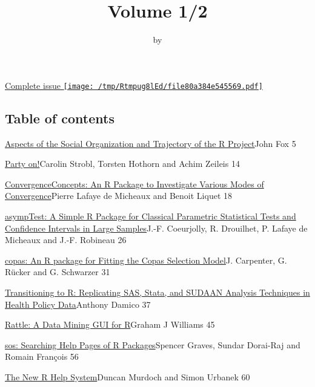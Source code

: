 \title{Volume 1/2}
\author{by }

\maketitle


\href{RJ-2009-2.pdf}{Complete issue
\protect\texttt{[image: /tmp/Rtmpug8lEd/file80a384e545569.pdf]}}

\hypertarget{table-of-contents}{%
\subsection{Table of contents}\label{table-of-contents}}

\href{../../articles/RJ-2009-014}{Aspects of the Social Organization and
Trajectory of the R Project}John Fox 5

\href{../../articles/RJ-2009-013}{Party on!}Carolin Strobl, Torsten
Hothorn and Achim Zeileis 14

\href{../../articles/RJ-2009-011}{ConvergenceConcepts: An R Package to
Investigate Various Modes of Convergence}Pierre Lafaye de Micheaux and
Benoit Liquet 18

\href{../../articles/RJ-2009-015}{asympTest: A Simple R Package for
Classical Parametric Statistical Tests and Confidence Intervals in Large
Samples}J.-F. Coeurjolly, R. Drouilhet, P. Lafaye de Micheaux and J.-F.
Robineau 26

\href{../../articles/RJ-2009-012}{copas: An R package for Fitting the
Copas Selection Model}J. Carpenter, G. Rücker and G. Schwarzer 31

\href{../../articles/RJ-2009-018}{Transitioning to R: Replicating SAS,
Stata, and SUDAAN Analysis Techniques in Health Policy Data}Anthony
Damico 37

\href{../../articles/RJ-2009-016}{Rattle: A Data Mining GUI for R}Graham
J Williams 45

\href{../../articles/RJ-2009-017}{sos: Searching Help Pages of R
Packages}Spencer Graves, Sundar Dorai-Raj and Romain François 56

\href{../../news/RJ-2009-2-Murdoch+Urbanek}{The New R Help System}Duncan
Murdoch and Simon Urbanek 60

